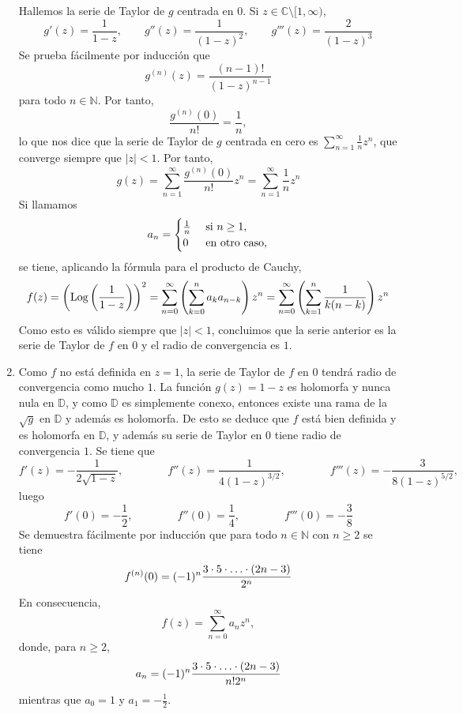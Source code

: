 \documentclass[11pt]{report}
\makeatletter
\renewenvironment{proof}[1][\proofname]{\par
  \pushQED{\qed}%
  \normalfont \topsep\z@skip %
  \trivlist
  \item[\hskip\labelsep
        \itshape
    #1\@addpunct{.}]\ignorespaces
}{%
  \popQED\endtrivlist\@endpefalse
}
\newcommand{\N}{\mathbb N}
\newcommand{\C}{\mathbb C}
\newcommand{\D}{\mathbb D}
\makeatother
\begin{document}
\begin{proof}
\begin{enumerate}
    Hallemos la serie de Taylor de $g$ centrada en $0$. Si $z \in \C \setminus [1,\infty)$,
    \[g'(z) = \frac{1}{1-z}, \qquad g''(z) = \frac{1}{(1-z)^2}, \qquad g'''(z) = \frac{2}{(1-z)^3}\]
    Se prueba fácilmente por inducción que
    \[g^{(n)}(z) = \frac{(n-1)!}{(1-z)^{n-1}}\]
    para todo $n \in \N$. Por tanto,
    \[\frac{g^{(n)}(0)}{n!} = \frac{1}{n},\]
    lo que nos dice que la serie de Taylor de $g$ centrada en cero es $\sum_{n=1}^\infty \frac{1}{n}z^n$, que converge siempre que $|z|<1$. Por tanto,
    \[g(z) = \sum_{n=1}^\infty \frac{g^{(n)}(0)}{n!}z^n = \sum_{n=1}^\infty \frac{1}{n}z^n\]
    Si llamamos
    \[a_n = \begin{cases}
        \frac{1}{n} & $ si $ n \geq 1, \\
        0 & $ en otro caso,$
    \end{cases}\]
    se tiene, aplicando la fórmula para el producto de Cauchy,
    \[f(z) =\left(\textup{Log}\left(\frac{1}{1-z}\right)\right)^2 = \sum_{n=0}^\infty \left( \sum_{k=0}^n a_ka_{n-k} \right)z^n=  \sum_{n=0}^\infty \left(\sum_{k=1}^n \frac{1}{k(n-k)}\right)z^n \]
    Como esto es válido siempre que $|z|<1$, concluimos que la serie anterior es la serie de Taylor de $f$ en $0$ y el radio de convergencia es $1$.
    \item Como $f$ no está definida en $z = 1$, la serie de Taylor de $f$ en $0$ tendrá radio de convergencia como mucho $1$. La función $g(z)=1-z$ es holomorfa y nunca nula en $\D$, y como $\D$ es simplemente conexo, entonces existe una rama de la $\sqrt{g}$ en $\D$ y además es holomorfa. De esto se deduce que $f$ está bien definida y es holomorfa en $\D$, y además su serie de Taylor en $0$ tiene radio de convergencia $1$. Se tiene que
    \[f'(z)=-\frac{1}{2\sqrt{1-z}}, \qquad \qquad f''(z)=\frac{1}{4(1-z)^{3/2}}, \qquad \qquad f'''(z)=-\frac{3}{8(1-z)^{5/2}},\]
    luego
    \[f'(0)=-\frac{1}{2}, \qquad \qquad f''(0)=\frac{1}{4}, \qquad \qquad f'''(0)=-\frac{3}{8}\]
    Se demuestra fácilmente por inducción que para todo $n \in \N$ con $n \geq 2$ se tiene
    \[f^{(n)}(0) =(-1)^{n} \frac{3\cdot 5 \cdot \mathellipsis \cdot (2n-3)}{2^{n}}\]
    En consecuencia,
    \[f(z)=\sum_{n=0}^\infty a_nz^n,\]
    donde, para $n \geq 2$,
    \[a_n =
         (-1)^n\frac{3\cdot 5 \cdot \mathellipsis \cdot (2n-3)}{n!2^{n}}\]
    mientras que $a_0=1$ y $a_1=-\frac{1}{2}$.
\end{enumerate}
\end{proof}
\end{document}
